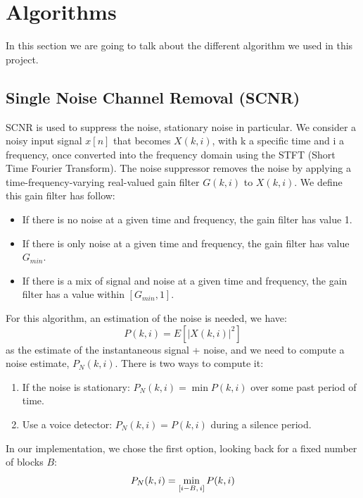 \documentclass[11pt,a4paper,titlepage]{report}
\providecommand{\tightlist}{%
	\setlength{\itemsep}{0pt}\setlength{\parskip}{0pt}}
\begin{document}
\section{Algorithms}
\hspace*{0.6cm}
In this section we are going to talk about the different algorithm we used in this project.
\subsection{Single Noise Channel Removal (SCNR)}
\label{sec:SCNR}
\hspace*{0.6cm}
SCNR is used to suppress the noise, stationary noise in particular. We consider a noisy input signal $ x[n] $ that becomes $ X(k,i) $, with k a specific time and i a frequency, once converted into the frequency domain using the STFT (Short Time Fourier Transform). The noise suppressor removes the noise by applying a time-frequency-varying real-valued gain filter $ G(k,i) $ to $ X(k,i) $. We define this gain filter has follow:
\begin{itemize}
	\tightlist
	\item If there is no noise at a given time and frequency, the gain filter has value 1.
	\item If there is only noise at a given time and frequency, the gain filter has value $ G_{min} $.
	\item If there is a mix of signal and noise at a given time and frequency, the gain filter has a value within $ [G_{min}, 1] $.
\end{itemize}
For this algorithm, an estimation of the noise is needed, we have:
 \[P(k,i) = E[|X(k,i)|^2]  \]
as the estimate of the instantaneous signal + noise, and we need to compute a noise estimate, $ P_{N}(k,i) $. There is two ways to compute it:
\begin{enumerate}
	\tightlist
	\item If the noise is stationary: $ P_{N}(k,i) = \min P(k,i) $ over some past period of time.
	\item Use a voice detector: $ P_{N}(k,i) = P(k,i) $ during a silence period.
\end{enumerate}
In our implementation, we chose the first option, looking back for a fixed number of blocks $ B $:
\begin{equation}
P_{N}(k,i) = \min_{[i- B, \hspace{0.05cm}i]} P(k,i)
\end{equation} 
\end{document}
